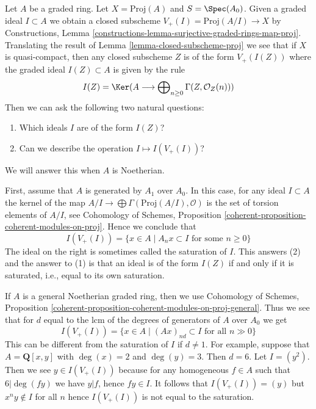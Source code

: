 \begin{example}
\label{example-closed-subscheme-of-proj}
Let $A$ be a graded ring. Let $X = \text{Proj}(A)$ and $S = \Spec(A_0)$.
Given a graded ideal $I \subset A$ we obtain a closed subscheme
$V_+(I) = \text{Proj}(A/I) \to X$ by Constructions, Lemma
\ref{constructions-lemma-surjective-graded-rings-map-proj}.
Translating the result of Lemma \ref{lemma-closed-subscheme-proj}
we see that if $X$ is quasi-compact, then any closed subscheme $Z$
is of the form $V_+(I(Z))$ where the graded ideal $I(Z) \subset A$
is given by the rule
$$
I(Z) = \Ker(A \longrightarrow
\bigoplus\nolimits_{n \geq 0} \Gamma(Z, \mathcal{O}_Z(n)))
$$
Then we can ask the following two natural questions:
\begin{enumerate}
\item Which ideals $I$ are of the form $I(Z)$?
\item Can we describe the operation $I \mapsto I(V_+(I))$?
\end{enumerate}
We will answer this when $A$ is Noetherian.

\medskip\noindent
First, assume that $A$ is generated by $A_1$ over $A_0$. In this case,
for any ideal $I \subset A$ the kernel of the map
$A/I \to \bigoplus \Gamma(\text{Proj}(A/I), \mathcal{O})$
is the set of torsion elements of $A/I$, see
Cohomology of Schemes, Proposition
\ref{coherent-proposition-coherent-modules-on-proj}.
Hence we conclude that
$$
I(V_+(I)) = \{x \in A \mid A_n x \subset I\text{ for some }n \geq 0\}
$$
The ideal on the right is sometimes called the saturation of $I$.
This answers (2) and the answer to (1) is that an ideal is
of the form $I(Z)$ if and only if it is saturated, i.e., equal
to its own saturation.

\medskip\noindent
If $A$ is a general Noetherian graded ring, then we use
Cohomology of Schemes, Proposition
\ref{coherent-proposition-coherent-modules-on-proj-general}.
Thus we see that for $d$ equal to the lcm of the degrees
of generators of $A$ over $A_0$ we get
$$
I(V_+(I)) = \{x \in A \mid (Ax)_{nd} \subset I\text{ for all }n \gg 0\}
$$
This can be different from the saturation of $I$ if $d \not = 1$.
For example, suppose that $A = \mathbf{Q}[x, y]$
with $\deg(x) = 2$ and $\deg(y) = 3$. Then $d = 6$.
Let $I = (y^2)$. Then we see $y \in I(V_+(I))$ because
for any homogeneous $f \in A$ such that $6 | \deg(fy)$
we have $y | f$, hence $fy \in I$. It follows that
$I(V_+(I)) = (y)$ but $x^n y \not \in I$ for all $n$
hence $I(V_+(I))$ is not equal to the saturation.
\end{example}

